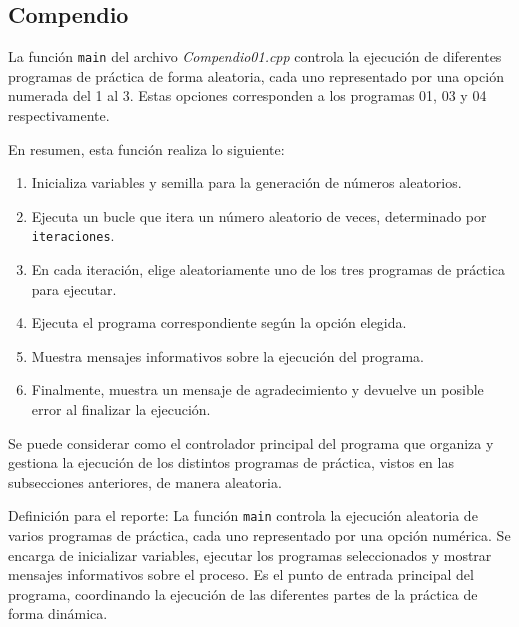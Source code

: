 \documentclass{article}
\begin{document}
    \subsection{Compendio}
    La función \texttt{main} del archivo \textit{Compendio01.cpp} controla la ejecución de diferentes programas de práctica de forma
    aleatoria, cada uno representado por una opción numerada del 1 al 3. Estas opciones corresponden a los programas 01, 03 y 04
    respectivamente.

    En resumen, esta función realiza lo siguiente:

    \begin{enumerate}
        \item Inicializa variables y semilla para la generación de números aleatorios.
        \item Ejecuta un bucle que itera un número aleatorio de veces, determinado por \texttt{iteraciones}.
        \item En cada iteración, elige aleatoriamente uno de los tres programas de práctica para ejecutar.
        \item Ejecuta el programa correspondiente según la opción elegida.
        \item Muestra mensajes informativos sobre la ejecución del programa.
        \item Finalmente, muestra un mensaje de agradecimiento y devuelve un posible error al finalizar la ejecución.
    \end{enumerate}

    Se puede considerar como el controlador principal del programa que organiza y gestiona la ejecución de los distintos programas de
    práctica, vistos en las subsecciones anteriores, de manera aleatoria.

    Definición para el reporte: La función \texttt{main} controla la ejecución aleatoria de varios programas de práctica, cada uno
    representado por una opción numérica. Se encarga de inicializar variables, ejecutar los programas seleccionados y mostrar mensajes
    informativos sobre el proceso. Es el punto de entrada principal del programa, coordinando la ejecución de las diferentes partes de
    la práctica de forma dinámica.
\end{document}
